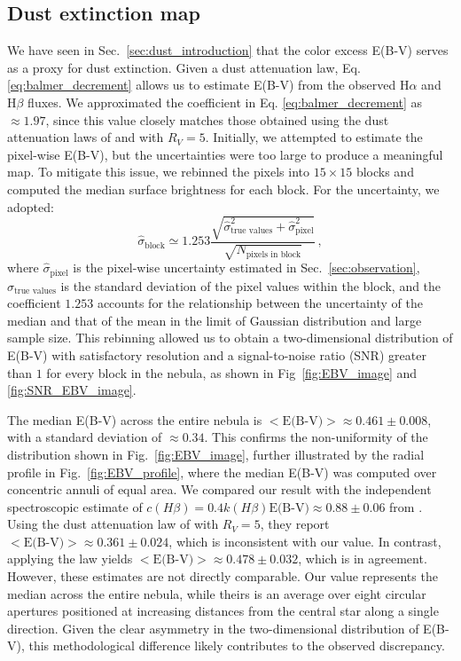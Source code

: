 \documentclass[fleqn,usenatbib]{mnras}
\begin{document}
\subsection{Dust extinction map}\label{sec:dust_results}
We have seen in Sec.~\ref{sec:dust_introduction} that the color excess E(B-V) serves as a proxy for dust extinction.
Given a dust attenuation law, Eq. \ref{eq:balmer_decrement} allows us to estimate E(B-V) from the observed H$\alpha$ and H$\beta$ fluxes.
We approximated the coefficient in Eq. \ref{eq:balmer_decrement} as $\approx 1.97$, since this value closely matches those obtained using the dust attenuation laws of \cite{Calzetti_2000} and \cite{Cardelli_1989} with $R_V = 5$.
Initially, we attempted to estimate the pixel-wise E(B-V), but the uncertainties were too large to produce a meaningful map.
To mitigate this issue, we rebinned the pixels into $15 \times 15$ blocks and computed the median surface brightness for each block.
For the uncertainty, we adopted:
\begin{equation}
  \hat{\sigma}_\text{block} \simeq 1.253 \dfrac{\sqrt{\hat{\sigma}_\text{true values}^2 + \hat{\sigma}_\text{pixel}^2}}{\sqrt{N_\text{pixels in block}}} \, ,
  \label{eq:rebinning_uncertainty}
\end{equation}
where $\hat{\sigma}_\text{pixel}$ is the pixel-wise uncertainty estimated in Sec.~\ref{sec:observation}, $\hat{\sigma}_\text{true values}$ is the standard deviation of the pixel values within the block, and the coefficient $1.253$ accounts for the relationship between the uncertainty of the median and that of the mean in the limit of Gaussian distribution and large sample size. 
This rebinning allowed us to obtain a two-dimensional distribution of E(B-V) with satisfactory resolution and a signal-to-noise ratio (SNR) greater than $1$ for every block in the nebula, as shown in Fig~\ref{fig:EBV_image} and \ref{fig:SNR_EBV_image}.
\smallskip

The median E(B-V) across the entire nebula is $<\text{E(B-V)}> \approx 0.461 \pm 0.008$, with a standard deviation of $\approx 0.34$. 
This confirms the non-uniformity of the distribution shown in Fig.~\ref{fig:EBV_image}, further illustrated by the radial profile in Fig.~\ref{fig:EBV_profile}, where the median E(B-V) was computed over concentric annuli of equal area.
We compared our result with the independent spectroscopic estimate of $c(H\beta) = 0.4 k(H\beta) \text{E(B-V)} \approx 0.88 \pm 0.06$ from \cite{Garcia-Rojas_2014}.
Using the dust attenuation law of \cite{Cardelli_1989} with $R_V = 5$, they report $<\text{E(B-V)}> \approx 0.361 \pm 0.024$, which is inconsistent with our value.
In contrast, applying the \cite{Calzetti_2000} law yields $<\text{E(B-V)}> \approx 0.478 \pm 0.032$, which is in agreement.
However, these estimates are not directly comparable. 
Our value represents the median across the entire nebula, while theirs is an average over eight circular apertures positioned at increasing distances from the central star along a single direction. 
Given the clear asymmetry in the two-dimensional distribution of E(B-V), this methodological difference likely contributes to the observed discrepancy.
\smallskip
\end{document}
